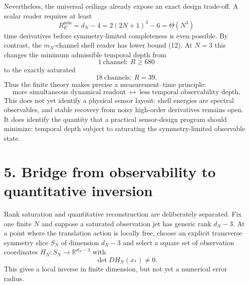 \documentclass[10pt,leqno,twoside]{article}
\newcommand{\R}{\mathbb R}
\theoremstyle{plain}
\theoremstyle{remark}
\begin{document}
Nevertheless, the universal ceilings already expose an exact design trade-off.  A scalar
reader requires at least
\begin{equation}
R_E^{\min}=d_N-4=2(2N+1)^3-6=\Theta(N^3)
\end{equation}
time derivatives before symmetry-limited completeness is even possible.  By contrast, the
$m_N$-channel shell reader has lower bound (12).  At $N=3$ this changes the minimum admissible
temporal depth from
\begin{equation}
\boxed{1\ \text{channel}:\ R\ge680}
\end{equation}
to the exactly saturated
\begin{equation}
\boxed{18\ \text{channels}:\ R=39.}
\end{equation}
Thus the finite theory makes precise a measurement--time principle:
\begin{equation}
\boxed{\text{more simultaneous dynamical readout}\ \longleftrightarrow\
\text{less temporal observability depth}.}
\end{equation}
This does not yet identify a physical sensor layout: shell energies are spectral observables,
and stable recovery from noisy high-order derivatives remains open.  It does identify the
quantity that a practical sensor-design program should minimize: temporal depth subject to
saturating the symmetry-limited observable state.

\section*{5. Bridge from observability to quantitative inversion}

Rank saturation and quantitative reconstruction are deliberately separated.  Fix one finite
$N$ and suppose a saturated observation jet has generic rank $d_N-3$.  At a point where the
translation action is locally free, choose an explicit transverse symmetry slice $S_N$ of
dimension $d_N-3$ and select a square set of observation coordinates
$H_N:S_N\to\R^{d_N-3}$ with
\begin{equation}
\det DH_N(x_*)\ne0.
\end{equation}
This gives a local inverse in finite dimension, but not yet a numerical error radius.
\end{document}
